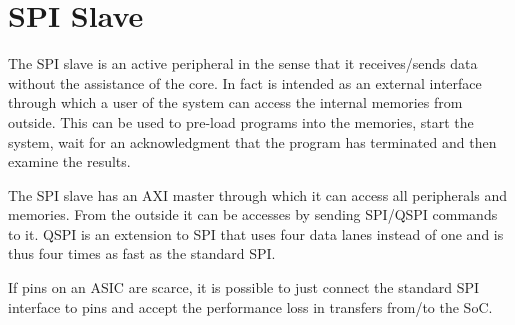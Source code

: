 \chapter{SPI Slave}

The SPI slave is an active peripheral in the sense that it receives/sends data
without the assistance of the core. In fact is intended as an external interface
through which a user of the system can access the internal memories from
outside.
This can be used to pre-load programs into the memories, start the system, wait
for an acknowledgment that the program has terminated and then examine the
results.

The SPI slave has an AXI master through which it can access all peripherals and
memories. From the outside it can be accesses by sending SPI/QSPI commands to it.
QSPI is an extension to SPI that uses four data lanes instead of one and is thus
four times as fast as the standard SPI.

If pins on an ASIC are scarce, it is possible to just connect the standard SPI
interface to pins and accept the performance loss in transfers from/to the SoC.
